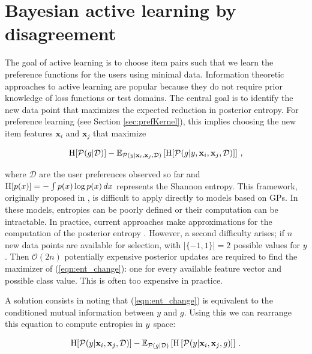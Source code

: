 \section{Bayesian active learning by disagreement\label{sec:active}}

The goal of active learning is to choose item pairs such that we learn the
preference functions for the users using minimal data.
Information theoretic approaches to active learning are popular because
they do not require prior knowledge of loss functions or test domains.
The central goal is to identify the new data point that maximizes the expected reduction in
posterior entropy. For preference learning
(see Section \ref{sec:prefKernel}), this implies
choosing the new item features $\mathbf{x}_i$ and $\mathbf{x}_j$ that maximize

\vspace{-0.65cm}
{\small
\begin{align}   
\mathrm{H}[\mathcal{P}(g|\mathcal{D})] - \mathbb{E}_{\mathcal{P}(y|\mathbf{x}_i,\mathbf{x}_j,\mathcal{D})} \left[ \mathrm{H}[\mathcal{P}(g|y,\mathbf{x}_i,\mathbf{x}_j,\mathcal{D})]\right]\,,
\label{eqn:ent_change}
\end{align}
}

\vspace{-0.65cm}
\normalsize where $\mathcal{D}$ are the user preferences observed so far and
$\mathrm{H}[p(x)]=-\int p(x)\log p(x)\,dx$ represents the Shannon entropy. 
This framework, originally proposed in \cite{lindley1956},
is difficult to apply directly to models based on GPs.
In these models, entropies can be poorly
defined or their computation can be intractable.
In practice, current approaches make
approximations for the computation of the posterior entropy \cite{mackay1992,lawrence2002}. 
However, a second difficulty arises; if $n$ new data points are
available for selection, with $|\{-1,1\}|=2$ possible values for $y$.
Then $\mathcal{O}(2n)$ potentially expensive posterior updates are required to find the maximizer
of (\ref{eqn:ent_change}): one for every available feature vector and possible class value.
This is often too expensive in practice.

A solution consists in noting that (\ref{eqn:ent_change}) is equivalent to the conditioned mutual information between $y$ and $g$.
Using this we can rearrange this equation to compute entropies in $y$ space:

\vspace{-0.65cm}
{\small
\begin{align}
\mathrm{H}[\mathcal{P}(y|\mathbf{x}_i,\mathbf{x}_j,\mathcal{D})] - \mathbb{E}_{\mathcal{P}(g|\mathcal{D})}
\left[\mathrm{H}\left[ \mathcal{P}(y|\mathbf{x}_i,\mathbf{x}_j,g)\right]\right]\,. \label{eqn:rearrangement} 
\end{align}
}

